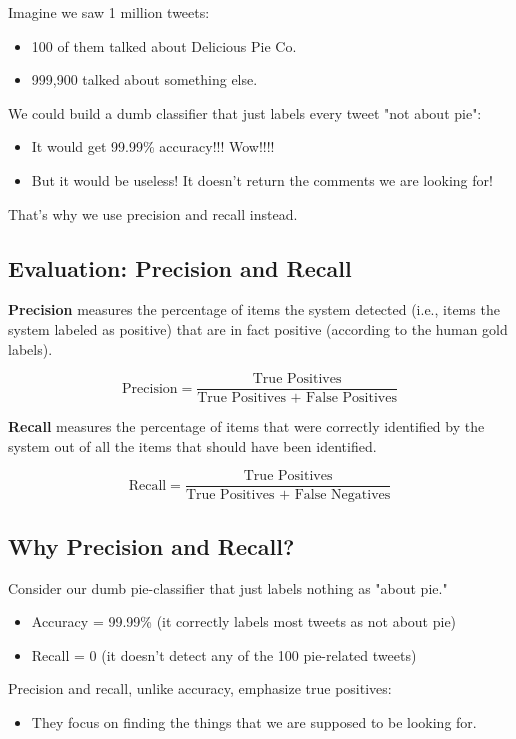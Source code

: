 \documentclass{book}
\begin{document}
Imagine we saw 1 million tweets:
\begin{itemize}
\item 100 of them talked about Delicious Pie Co.
\item 999,900 talked about something else.
\end{itemize}

We could build a dumb classifier that just labels every tweet "not about pie":
\begin{itemize}
\item It would get 99.99\% accuracy!!! Wow!!!!
\item But it would be useless! It doesn't return the comments we are looking for!
\end{itemize}

That's why we use precision and recall instead.

\subsection{Evaluation: Precision and Recall}
\textbf{Precision} measures the percentage of items the system detected (i.e., items the system labeled as positive) that are in fact positive (according to the human gold labels).

\[
\text{Precision} = \frac{\text{True Positives}}{\text{True Positives + False Positives}}
\]


\textbf{Recall} measures the percentage of items that were correctly identified by the system out of all the items that should have been identified.

\[
\text{Recall} = \frac{\text{True Positives}}{\text{True Positives + False Negatives}}
\]



\subsection{Why Precision and Recall?}
Consider our dumb pie-classifier that just labels nothing as "about pie."

\begin{itemize}
  \item Accuracy = 99.99\% (it correctly labels most tweets as not about pie)
  \item Recall = 0 (it doesn't detect any of the 100 pie-related tweets)
\end{itemize}

Precision and recall, unlike accuracy, emphasize true positives:
\begin{itemize}
  \item They focus on finding the things that we are supposed to be looking for.
\end{itemize}
\end{document}
